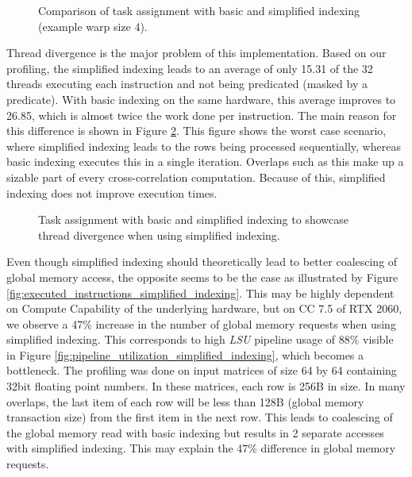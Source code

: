 \begin{figure}[ht]
	\centering
	\def\svgwidth{0.5\textwidth}
	\fontsize{8}{10}\selectfont
	
	\caption{Comparison of task assignment with basic and simplified indexing (example warp size 4).}
	\label{fig:warp_per_shift_simplified_indexing}
\end{figure}

Thread divergence is the major problem of this implementation. Based on our profiling, the simplified indexing leads to an average of only 15.31 of the 32 threads executing each instruction and not being predicated (masked by a predicate). With basic indexing on the same hardware, this average improves to 26.85, which is almost twice the work done per instruction. The main reason for this difference is shown in Figure \ref{fig:warp_per_shift_thread_divergence}. This figure shows the worst case scenario, where simplified indexing leads to the rows being processed sequentially, whereas basic indexing executes this in a single iteration. Overlaps such as this make up a sizable part of every cross-correlation computation. Because of this, simplified indexing does not improve execution times.

\begin{figure}[ht]
	\centering
	\def\svgwidth{0.45\textwidth}
	\fontsize{8}{10}\selectfont
	
	\caption{Task assignment with basic and simplified indexing to showcase thread divergence when using simplified indexing.}
	\label{fig:warp_per_shift_thread_divergence}
\end{figure}

Even though simplified indexing should theoretically lead to better coalescing of global memory access, the opposite seems to be the case as illustrated by Figure \ref{fig:executed_instructions_simplified_indexing}. This may be highly dependent on Compute Capability of the underlying hardware, but on CC 7.5 of RTX 2060, we observe a 47\% increase in the number of global memory requests when using simplified indexing. This corresponds to high \textit{LSU} pipeline usage of 88\% visible in Figure \ref{fig:pipeline_utilization_simplified_indexing}, which becomes a bottleneck. The profiling was done on input matrices of size 64 by 64 containing 32bit floating point numbers. In these matrices, each row is 256B in size. In many overlaps, the last item of each row will be less than 128B (global memory transaction size) from the first item in the next row. This leads to coalescing of the global memory read with basic indexing but results in 2 separate accesses with simplified indexing. This may explain the 47\% difference in global memory requests.

